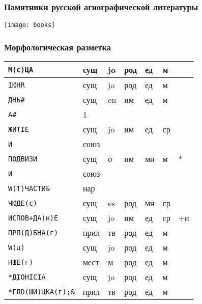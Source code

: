 \begin{frame}
  \frametitle{Памятники русской агиографической литературы}

  \begin{center}
    \texttt{[image: books]}
  \end{center}
\end{frame}

\begin{frame}
  \frametitle{Морфологическая разметка}

  \footnotesize \setlength{\aboverulesep}{0.5pt} \setlength{\belowrulesep}{0.5pt}
  \begin{tabularx}{\textwidth}{Xp{0.75cm}p{0.75cm}p{0.75cm}p{0.75cm}p{0.75cm}p{0.75cm}}
    \toprule
    \texttt{М(с)ЦА} & сущ  & jo & род & ед & м  &    \\ \midrule
    \texttt{IЮНR} & сущ  & jo & род & ед & м  &    \\ \midrule
    \texttt{ДНЬ\#} & сущ  & en & им  & ед & м  &    \\ \midrule
    \texttt{А\#} & 1    &    &     &    &    &    \\ \midrule
    \texttt{ЖИТIЕ} & сущ  & jo & им  & ед & ср &    \\ \midrule
    \texttt{И} & союз &    &     &    &    &    \\ \midrule
    \texttt{ПОДВИЗИ} & сущ  & о  & им  & мн & м  & *  \\ \midrule
    \texttt{И} & союз &    &     &    &    &    \\ \midrule
    \texttt{W(Т)ЧАСТИ\&} & нар  &    &     &    &    &    \\ \midrule
    \texttt{ЧЮДЕ(с)} & сущ  & es & род & мн & ср &    \\ \midrule
    \texttt{ИСПОВ+ДА(н)Е} & сущ  & jo & им  & ед & ср & +и \\ \midrule
    \texttt{ПРП(Д)БНА(г)} & прил & тв & род & ед & м  &    \\ \midrule
    \texttt{W(ц)} & сущ  & jo & род & ед & м  &    \\ \midrule
    \texttt{НШЕ(г)} & мест & м  & род & ед & м  &    \\ \midrule
    \texttt{*ДIОНIСIА} & сущ  & jo & род & ед & м  &    \\ \midrule
    \texttt{*ГЛD(ШИ)ЦКА(г);\&} & прил & тв & род & ед & м  &    \\ \bottomrule
  \end{tabularx}
\end{frame}

